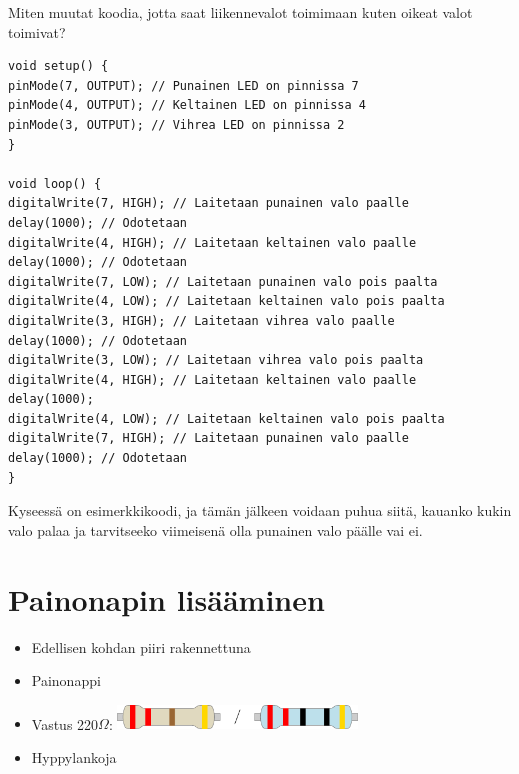 \begin{tcolorbox}[colback=yellow!10, title={Koodaa!},colbacktitle=orange]
Miten muutat koodia, jotta saat liikennevalot toimimaan kuten oikeat valot toimivat? 
\begin{solution}
\begin{lstlisting}
void setup() {
pinMode(7, OUTPUT); // Punainen LED on pinnissa 7
pinMode(4, OUTPUT); // Keltainen LED on pinnissa 4
pinMode(3, OUTPUT); // Vihrea LED on pinnissa 2
}

void loop() {
digitalWrite(7, HIGH); // Laitetaan punainen valo paalle
delay(1000); // Odotetaan
digitalWrite(4, HIGH); // Laitetaan keltainen valo paalle
delay(1000); // Odotetaan
digitalWrite(7, LOW); // Laitetaan punainen valo pois paalta
digitalWrite(4, LOW); // Laitetaan keltainen valo pois paalta
digitalWrite(3, HIGH); // Laitetaan vihrea valo paalle
delay(1000); // Odotetaan
digitalWrite(3, LOW); // Laitetaan vihrea valo pois paalta
digitalWrite(4, HIGH); // Laitetaan keltainen valo paalle
delay(1000);
digitalWrite(4, LOW); // Laitetaan keltainen valo pois paalta
digitalWrite(7, HIGH); // Laitetaan punainen valo paalle
delay(1000); // Odotetaan
}

\end{lstlisting}
Kyseessä on esimerkkikoodi, ja tämän jälkeen voidaan puhua siitä, kauanko kukin valo palaa ja tarvitseeko viimeisenä olla punainen valo päälle vai ei.
\end{solution}
\end{tcolorbox}

\clearpage
\section{Painonapin lisääminen}
\begin{tcolorbox}[colback=lime!10,title=Tarvikkeet, colbacktitle=green!10,coltitle=black]
\begin{itemize}
    \item Edellisen kohdan piiri rakennettuna
    \item Painonappi
    \item Vastus 220$\Omega$: \includegraphics[width=0.5\textwidth]{kuvat/220.pdf}
    \item Hyppylankoja
\end{itemize}
\end{tcolorbox}


